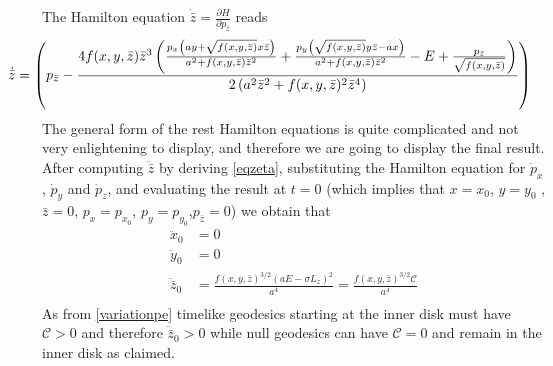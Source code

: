 \begin{Proof}
The Hamilton equation $\dot{\bar{z}}=\frac{\partial H}{\partial p_{\bar{z}}}$ reads
\begin{equation}\label{eqzeta}
\hspace{-0.1\textwidth}
 \dot{\bar{z}}=\left(p_{\bar{z}}-\frac{4 f(x,y,\bar{z}) {\bar{z}}^3 \left(\frac{p_x \left(a y+\sqrt{f(x,y,\bar{z})} x {\bar{z}}\right)}{a^2+f(x,y,\bar{z}) {\bar{z}}^2}+\frac{p_y \left(\sqrt{f(x,y,\bar{z})} y {\bar{z}}-a x\right)}{a^2+f(x,y,\bar{z}) {\bar{z}}^2}-E+\frac{p_{\bar{z}}}{\sqrt{f(x,y,\bar{z})}}\right)}{2 \left( a^2 {\bar{z}}^2+f(x,y,\bar{z})^2 {\bar{z}}^4 \right)}\right)
\end{equation}
The general form of the rest Hamilton equations is quite complicated and not very enlightening to display, and therefore we are going to display the final result. After computing $\ddot{\bar{z}}$ by deriving \cref{eqzeta}, substituting the Hamilton equation for $\dot{p}_x$ , $\dot{p}_y$ and $\dot{p}_z$, and evaluating the result at $t=0$ (which implies that $x=x_0$, $y=y_0$ ,$\bar{z}=0$, $p_x=p_{x_0}$, $p_y=p_{y_0}$,$p_{\bar{z}}=0$) we obtain that
\begin{align}
 \ddot{x}_0&=0\\
  \ddot{y}_0&=0\\
   \ddot{\bar{z}}_0&=\frac{f(x,y,\bar{z})^{3/2} (a E-\sigma L_z)^2}{a^4}=\frac{f(x,y,\bar{z})^{3/2} \mathcal{C}}{a^4}\\
\end{align}
As from \cref{variationpe} timelike geodesics starting at the inner disk must have $\mathcal{C}>0$ and therefore $\ddot{\bar{z}}_0>0$ while null geodesics can have  $\mathcal{C}=0$ and remain in the inner disk as claimed.\end{Proof}
